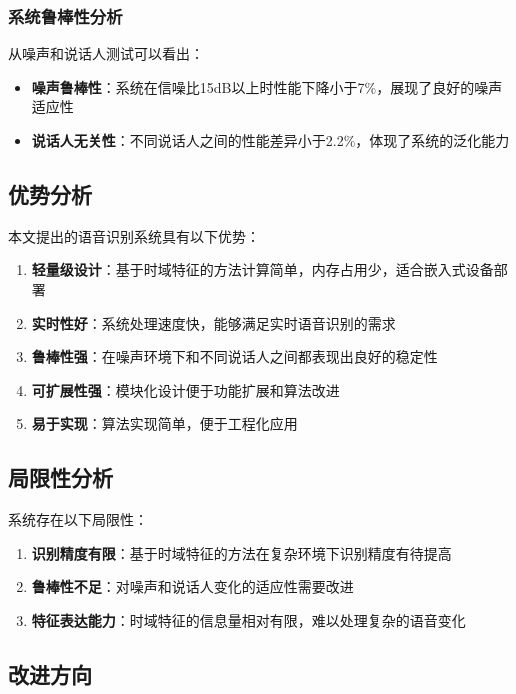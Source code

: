 \documentclass[sigconf,nonacm]{acmart}
\begin{document}
\subsubsection{系统鲁棒性分析}

从噪声和说话人测试可以看出：
\begin{itemize}
\item \textbf{噪声鲁棒性}：系统在信噪比15dB以上时性能下降小于7\%，展现了良好的噪声适应性
\item \textbf{说话人无关性}：不同说话人之间的性能差异小于2.2\%，体现了系统的泛化能力
\end{itemize}

\subsection{优势分析}

本文提出的语音识别系统具有以下优势：

\begin{enumerate}
\item \textbf{轻量级设计}：基于时域特征的方法计算简单，内存占用少，适合嵌入式设备部署
\item \textbf{实时性好}：系统处理速度快，能够满足实时语音识别的需求
\item \textbf{鲁棒性强}：在噪声环境下和不同说话人之间都表现出良好的稳定性
\item \textbf{可扩展性强}：模块化设计便于功能扩展和算法改进
\item \textbf{易于实现}：算法实现简单，便于工程化应用
\end{enumerate}

\subsection{局限性分析}

系统存在以下局限性：

\begin{enumerate}
\item \textbf{识别精度有限}：基于时域特征的方法在复杂环境下识别精度有待提高
\item \textbf{鲁棒性不足}：对噪声和说话人变化的适应性需要改进
\item \textbf{特征表达能力}：时域特征的信息量相对有限，难以处理复杂的语音变化
\end{enumerate}

\subsection{改进方向}
\end{document}
